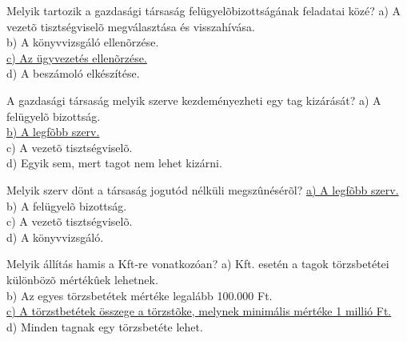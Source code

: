 \begin{frame}

\begin{tcolorbox}[title={73. Kérdés}]
Melyik tartozik a gazdasági társaság felügyelõbizottságának feladatai közé?
\tcblower
a) A vezetõ tisztségviselõ megválasztása és visszahívása.\\
b) A könyvvizsgáló ellenõrzése.\\
\uline {c) Az ügyvezetés ellenõrzése.}\\
d) A beszámoló elkészítése.
\end{tcolorbox}

\begin{tcolorbox}[title={74. Kérdés}]
A gazdasági társaság melyik szerve kezdeményezheti egy tag kizárását?
\tcblower
a) A felügyelõ bizottság.\\
\uline {b) A legfõbb szerv.}\\
c) A vezetõ tisztségviselõ.\\
d) Egyik sem, mert tagot nem lehet kizárni.
\end{tcolorbox}

\begin{tcolorbox}[title={75. Kérdés}]
Melyik szerv dönt a társaság jogutód nélküli megszûnésérõl?
\tcblower
\uline {a) A legfõbb szerv.}\\
b) A felügyelõ bizottság.\\
c) A vezetõ tisztségviselõ.\\
d) A könyvvizsgáló. 
\end{tcolorbox}

\begin{tcolorbox}[title={76. Kérdés}]
Melyik állítás hamis a Kft-re vonatkozóan?
\tcblower
a) Kft. esetén a tagok törzsbetétei különbözõ mértékûek lehetnek.\\
b) Az egyes törzsbetétek mértéke legalább 100.000 Ft.\\
\uline {c) A törzstbetétek összege a törzstõke, melynek minimális mértéke 1 millió Ft.}\\
d) Minden tagnak egy törzsbetéte lehet.
\end{tcolorbox}

\end{frame}


